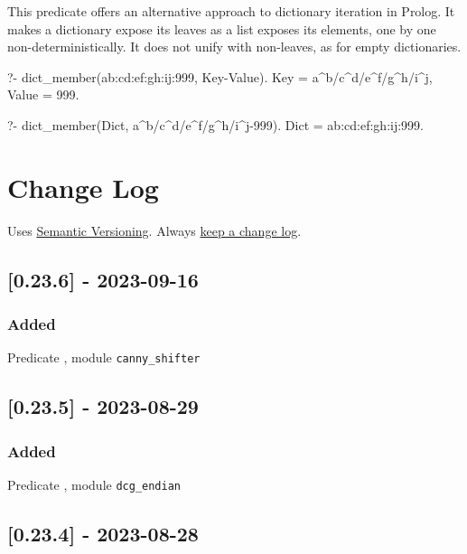 This predicate offers an alternative approach to dictionary iteration in
Prolog. It makes a dictionary expose its leaves as a list exposes its
elements, one by one non-deterministically. It does not unify with
non-leaves, as for empty dictionaries.

\begin{code}
?- dict_member(a{b:c{d:e{f:g{h:i{j:999}}}}}, Key-Value).
Key = a^b/c^d/e^f/g^h/i^j,
Value = 999.

?- dict_member(Dict, a^b/c^d/e^f/g^h/i^j-999).
Dict = a{b:c{d:e{f:g{h:i{j:999}}}}}.
\end{code}

\chapter{Change Log}

Uses \href{https://semver.org/}{Semantic Versioning}. Always \href{https://keepachangelog.com/en/1.0.0/}{keep a change
log}.

\section{[0.23.6] - 2023-09-16}

\subsection{Added}

\begin{shortlist}
    \item Predicate , module \verb$canny_shifter$
\end{shortlist}

\section{[0.23.5] - 2023-08-29}

\subsection{Added}

\begin{shortlist}
    \item Predicate , module \verb$dcg_endian$
\end{shortlist}

\section{[0.23.4] - 2023-08-28}

